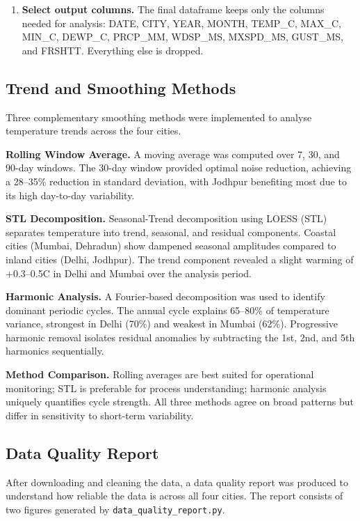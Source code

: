 \begin{enumerate}
    \item \textbf{Select output columns.}
    The final dataframe keeps only the columns needed for analysis:
    DATE, CITY, YEAR, MONTH, TEMP\_C, MAX\_C, MIN\_C, DEWP\_C, PRCP\_MM,
    WDSP\_MS, MXSPD\_MS, GUST\_MS, and FRSHTT. Everything else is dropped.

\end{enumerate}

\subsection{Trend and Smoothing Methods}

Three complementary smoothing methods were implemented to analyse temperature
trends across the four cities.

\textbf{Rolling Window Average.}
A moving average was computed over 7, 30, and 90-day windows.
The 30-day window provided optimal noise reduction, achieving a 28--35\% reduction
in standard deviation, with Jodhpur benefiting most due to its high day-to-day
variability.

\textbf{STL Decomposition.}
Seasonal-Trend decomposition using LOESS (STL) separates temperature into trend,
seasonal, and residual components.
Coastal cities (Mumbai, Dehradun) show dampened seasonal amplitudes compared to
inland cities (Delhi, Jodhpur).
The trend component revealed a slight warming of +0.3--0.5\textdegree C in Delhi
and Mumbai over the analysis period.

\textbf{Harmonic Analysis.}
A Fourier-based decomposition was used to identify dominant periodic cycles.
The annual cycle explains 65--80\% of temperature variance, strongest in Delhi
(70\%) and weakest in Mumbai (62\%).
Progressive harmonic removal isolates residual anomalies by subtracting the
1st, 2nd, and 5th harmonics sequentially.

\textbf{Method Comparison.}
Rolling averages are best suited for operational monitoring; STL is preferable
for process understanding; harmonic analysis uniquely quantifies cycle strength.
All three methods agree on broad patterns but differ in sensitivity to short-term
variability.

\subsection{Data Quality Report}

After downloading and cleaning the data, a data quality report was produced
to understand how reliable the data is across all four cities.
The report consists of two figures generated by \texttt{data\_quality\_report.py}.

